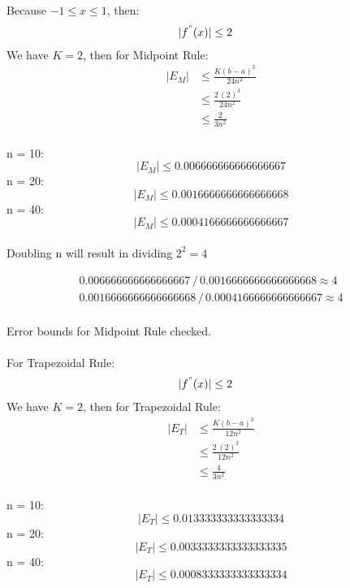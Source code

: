 \documentclass{article}
\begin{document}
    Because $-1 \leq x \leq 1$, then:
    \begin{align*}
        |f^{"}(x)| & \leq 2
    \end{align*}
    We have $K = 2$, then for Midpoint Rule:
    \begin{align*}
        |E_{M}| &\leq \frac{K(b-a)^{3}}{24n^2} \\
        &\leq \frac{2\,(2)^3}{24n^2} \\
        &\leq \frac{2}{3n^2}
    \end{align*} \\

    n = 10: \\
    $$ |E_{M}| \leq 0.006666666666666667 $$
    n = 20: \\
    $$ |E_{M}| \leq 0.0016666666666666668 $$
    n = 40: \\
    $$ |E_{M}| \leq 0.0004166666666666667 $$ \\

    Doubling n will result in dividing $2^{2} = 4$

    \begin{align*}
        0.006666666666666667\, / \,0.0016666666666666668 \approx 4 \\
        0.0016666666666666668\, / \, 0.0004166666666666667 \approx 4 \\
    \end{align*}

    Error bounds for Midpoint Rule checked.\\\\

    For Trapezoidal Rule:
    \begin{align*}
        |f^{"}(x)| & \leq 2
    \end{align*}
    We have $K = 2$, then for Trapezoidal Rule:
    \begin{align*}
        |E_{T}| &\leq \frac{K(b-a)^{3}}{12n^2} \\
        &\leq \frac{2\,(2)^3}{12n^2} \\
        &\leq \frac{4}{3n^2}
    \end{align*} \\

    n = 10: \\
    $$ |E_{T}| \leq 0.013333333333333334 $$
    n = 20: \\
    $$ |E_{T}| \leq 0.0033333333333333335 $$
    n = 40: \\
    $$ |E_{T}| \leq 0.0008333333333333334 $$ \\
\end{document}
